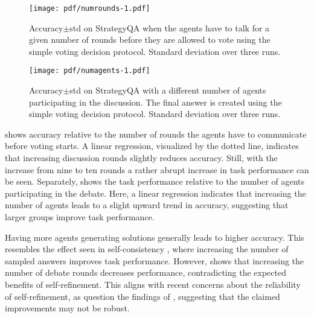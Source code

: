 \begin{figure}[t]
  \centering
  \texttt{[image: pdf/numrounds-1.pdf]}
  \caption{Accuracy{\tiny$\pm$std} on StrategyQA when the agents have to talk for a given number of rounds before they are allowed to vote using the simple voting decision protocol. Standard deviation over three runs.
  \vspace{-0.5cm}}
  \label{fig:num_rounds}
\end{figure}

\begin{figure}[t]
  \centering
  \texttt{[image: pdf/numagents-1.pdf]}
  \caption{Accuracy{\tiny$\pm$std} on StrategyQA with a different number of agents participating in the discussion. The final answer is created using the simple voting decision protocol. Standard deviation over three runs.
  \vspace{-0.5cm}}
  \label{fig:num_agents}
\end{figure}

 shows accuracy relative to the number of rounds the agents have to communicate before voting starts. 
A linear regression, visualized by the dotted line, indicates that increasing discussion rounds slightly reduces accuracy. 
Still, with the increase from nine to ten rounds a rather abrupt increase in task performance can be seen.  
Separately,  shows the task performance relative to the number of agents participating in the debate. 
Here, a linear regression indicates that increasing the number of agents leads to a slight upward trend in accuracy, suggesting that larger groups improve task performance.


Having more agents generating solutions generally leads to higher accuracy.
This resembles the effect seen in self-consistency \citep{wang_self-consistency_2022}, where increasing the number of sampled answers improves task performance.
However,  shows that increasing the number of debate rounds decreases performance, contradicting the expected benefits of self-refinement.
This aligns with recent concerns about the reliability of self-refinement, as \citet{huang_large_2024} question the findings of \citet{madaan_self-refine_2023}, suggesting that the claimed improvements may not be robust.

